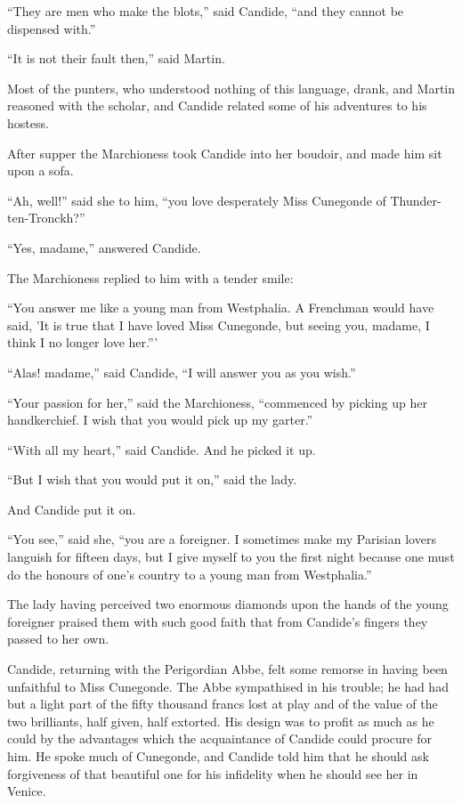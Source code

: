 ``They are men who make the blots,'' said Candide, ``and they cannot be dispensed with.''

``It is not their fault then,'' said Martin.

Most of the punters, who understood nothing of this language, drank, and Martin reasoned with the scholar, and Candide related some of his adventures to his hostess.

After supper the Marchioness took Candide into her boudoir, and made him sit upon a sofa.

``Ah, well!'' said she to him, ``you love desperately Miss Cunegonde of Thunder-ten-Tronckh?''

``Yes, madame,'' answered Candide.

The Marchioness replied to him with a tender smile:

``You answer me like a young man from Westphalia. A Frenchman would have said, 'It is true that I have loved Miss Cunegonde, but seeing you, madame, I think I no longer love her.'''

``Alas! madame,'' said Candide, ``I will answer you as you wish.''

``Your passion for her,'' said the Marchioness, ``commenced by picking up her handkerchief. I wish that you would pick up my garter.''

``With all my heart,'' said Candide. And he picked it up.

``But I wish that you would put it on,'' said the lady.

And Candide put it on.

``You see,'' said she, ``you are a foreigner. I sometimes make my Parisian lovers languish for fifteen days, but I give myself to you the first night because one must do the honours of one's country to a young man from Westphalia.''

The lady having perceived two enormous diamonds upon the hands of the young foreigner praised them with such good faith that from Candide's fingers they passed to her own.

Candide, returning with the Perigordian Abbe, felt some remorse in having been unfaithful to Miss Cunegonde. The Abbe sympathised in his trouble; he had had but a light part of the fifty thousand francs lost at play and of the value of the two brilliants, half given, half extorted. His design was to profit as much as he could by the advantages which the acquaintance of Candide could procure for him. He spoke much of Cunegonde, and Candide told him that he should ask forgiveness of that beautiful one for his infidelity when he should see her in Venice.

